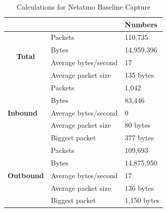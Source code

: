\begin{table}[H]
    \caption{Calculations for Netatmo Baseline Capture}
    \centering
    \begin{tabular}{ll|l|}
        \cline{3-3}                                               &                               &             \textbf{Numbers} \\ \hline
        \multicolumn{1}{|c|}{\multirow{4}{*}{\textbf{Total}}}    & Packets              & 110,735         \\ \cline{2-3} 
        \multicolumn{1}{|c|}{}                                   & Bytes                & 14,959,396       \\ \cline{2-3} 
        \multicolumn{1}{|c|}{}                                   & Average bytes/second & 17               \\ \cline{2-3} 
        \multicolumn{1}{|c|}{}                                   & Average packet size  & 135 bytes        \\ \hline
        \multicolumn{1}{|l|}{\multirow{5}{*}{\textbf{Inbound}}}  & Packets              & 1,042            \\ \cline{2-3} 
        \multicolumn{1}{|l|}{}                                   & Bytes                & 83,446           \\ \cline{2-3} 
        \multicolumn{1}{|l|}{}                                   & Average bytes/second & 0                \\ \cline{2-3} 
        \multicolumn{1}{|l|}{}                                   & Average packet size  & 80 bytes          \\ \cline{2-3} 
        \multicolumn{1}{|l|}{}                                   & Biggest packet       & 377 bytes        \\ \hline
        \multicolumn{1}{|l|}{\multirow{5}{*}{\textbf{Outbound}}} & Packets              & 109,693          \\ \cline{2-3} 
        \multicolumn{1}{|l|}{}                                   & Bytes                & 14,875,950       \\ \cline{2-3} 
        \multicolumn{1}{|l|}{}                                   & Average bytes/second & 17               \\ \cline{2-3} 
        \multicolumn{1}{|l|}{}                                   & Average packet size  & 136 bytes         \\ \cline{2-3} 
        \multicolumn{1}{|l|}{}                                   & Biggest packet       & 1,150 bytes       \\ \hline
    \end{tabular}
    \label{tab:NetatmoBaselineCalculations}
\end{table}
